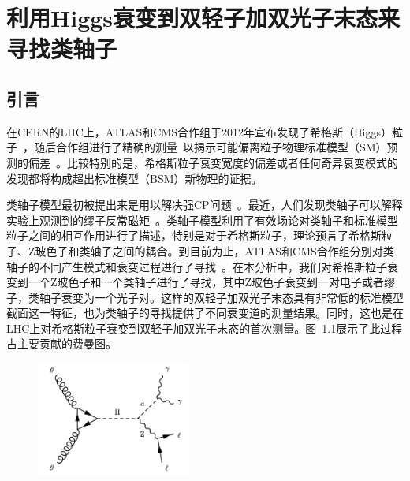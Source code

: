 
\chapter{利用Higgs衰变到双轻子加双光子末态来寻找类轴子}

\section{引言}

在CERN的LHC上，ATLAS和CMS合作组于2012年宣布发现了希格斯（Higgs）粒子~\cite{HiggsdiscoveryAtlas, Chatrchyan:2012ufa, Chatrchyan:2013lba}，随后合作组进行了精确的测量~\cite{Hzz_xsec_13,Hzz_xsec_13_v2, Hgg_properties_13_v2, Sirunyan:2021fpv,ttH_13,ttH_13_v2,Hww_diff_13,CMS_mass,ATLAS_mass,ATLAS_xsec,Aaboud:2017vzb,Khachatryan:2016vau}以揭示可能偏离粒子物理标准模型（SM）预测的偏差~\cite{CMS_ALP_3}。比较特别的是，希格斯粒子衰变宽度的偏差或者任何奇异衰变模式的发现都将构成超出标准模型（BSM）新物理的证据。

类轴子模型最初被提出来是用以解决强CP问题~\cite{PhysRevLett.38.1440}。最近，人们发现类轴子可以解释实验上观测到的缪子反常磁矩~\cite{PhysRevLett.119.031802}。类轴子模型利用了有效场论对类轴子和标准模型粒子之间的相互作用进行了描述，特别是对于希格斯粒子，理论预言了希格斯粒子、Z玻色子和类轴子之间的耦合。到目前为止，ATLAS和CMS合作组分别对类轴子的不同产生模式和衰变过程进行了寻找~\cite{CMS_ALP_3, atlas2022search, aad2021measurement, atlas_ALP_2, atlas_ALP_3, CMS_ALP_1, cms2022search}。在本分析中，我们对希格斯粒子衰变到一个Z玻色子和一个类轴子进行了寻找，其中Z玻色子衰变到一对电子或者缪子，类轴子衰变为一个光子对。这样的双轻子加双光子末态具有非常低的标准模型截面这一特征，也为类轴子的寻找提供了不同衰变道的测量结果。同时，这也是在LHC上对希格斯粒子衰变到双轻子加双光子末态的首次测量。图~\ref{fig:Feyman}展示了此过程占主要贡献的费曼图。

\begin{figure}[htbp]
  \begin{center}
	\includegraphics[width=0.45\textwidth]{Thesis (Version 2246)/figures/chapter04/Feyman_diagram.png}
    \label{fig:Feyman}
\end{center}
\end{figure}

